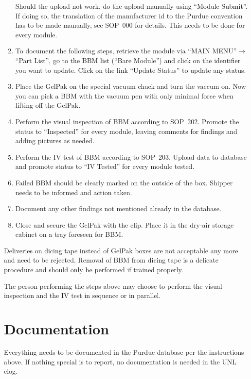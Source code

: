 \documentclass[12pt]{unlsilabsop}
\begin{document}
\begin{enumerate}
    Should the upload not work, do the upload manually using ``Module Submit''. If doing so, the translation of the manufacturer id to the Purdue convention has to be made manually, see SOP~000 for details. This needs to be done for every module.
    \item To document the following steps, retrieve the module via ``MAIN MENU''$\rightarrow$``Part List'', go to the BBM list (``Bare Module'') and click on the identifier you want to update. Click on the link ``Update Status'' to update any status.
    \item Place the GelPak on the special vacuum chuck and turn the vaccum on. Now you can pick a BBM with the vacuum pen with only minimal force when lifting off the GelPak.
    \item Perform the visual inspection of BBM according to SOP~202. Promote the status to ``Inspected'' for every module, leaving comments for findings and adding pictures as needed.
    \item Perform the IV test of BBM according to SOP~203. Upload data to database and promote status to ``IV Tested'' for every module tested.
    \item Failed BBM should be clearly marked on the outside of the box. Shipper needs to be informed and action taken.
    \item Document any other findings not mentioned already in the database.
    \item Close and secure the GelPak with the clip. Place it in the dry-air storage cabinet on a tray foreseen for BBM.
\end{enumerate}
Deliveries on dicing tape instead of GelPak boxes are not acceptable any more and need to be rejected. Removal of BBM from dicing tape is a delicate procedure and should only be performed if trained properly.

The person performing the steps above may choose to perform the visual inspection and the IV test in sequence or in parallel.

\section{Documentation}
Everything needs to be documented in the Purdue database per the instructions above. If nothing special is to report, no documentation is needed in the UNL elog.
\end{document}

